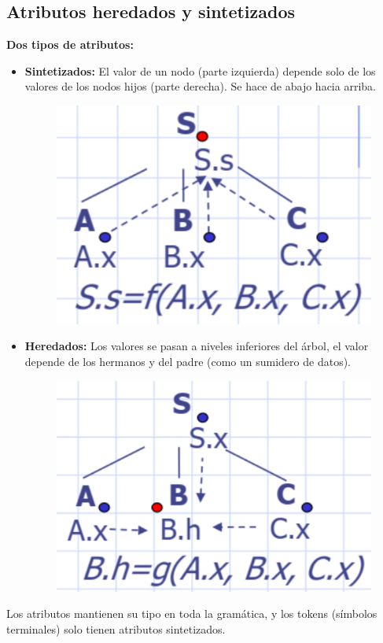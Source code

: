 \documentclass[12pt]{report} %
\begin{document}
\subsection{Atributos heredados y sintetizados}
\textbf{Dos tipos de atributos:}
\begin{itemize}
  \item \textbf{Sintetizados:} El valor de un nodo (parte izquierda) depende solo de los valores de los nodos hijos (parte derecha). Se hace de abajo hacia arriba.
  \begin{figure}[H]
    {\includegraphics[scale=.3]{2021-04-21 10_46_33-05_resum_Sem_2021.pdf - Foxit Reader.png}}
  \end{figure}

  \item \textbf{Heredados:} Los valores se pasan a niveles inferiores del árbol, el valor depende de los hermanos y del padre (como un sumidero de datos).
  
  \begin{figure}[H]
    {\includegraphics[scale=.3]{2021-04-21 10_47_58-05_resum_Sem_2021.pdf - Foxit Reader.png}}
  \end{figure}

\end{itemize}
Los atributos mantienen su tipo en toda la gramática, y los tokens (símbolos terminales) solo tienen atributos sintetizados.
\end{document}
